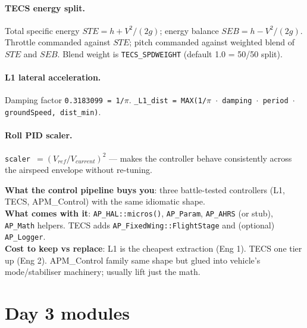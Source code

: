 \documentclass[a4paper,11pt,twoside]{article}
\renewcommand{\adoptionsidebar}[1]{\begin{tcolorbox}[colback=cyan!4!white,colframe=cyan!50!black,title=Adoption side-bar,breakable]#1\end{tcolorbox}}
\begin{document}
\paragraph{TECS energy split.} Total specific energy $STE = h + V^2/(2g)$; energy balance $SEB = h - V^2/(2g)$. Throttle commanded against $STE$; pitch commanded against weighted blend of $STE$ and $SEB$. Blend weight is \texttt{TECS\_SPDWEIGHT} (default 1.0 = 50/50 split).

\paragraph{L1 lateral acceleration.} Damping factor \texttt{0.3183099 = 1/$\pi$}. \texttt{\_L1\_dist = MAX(1/$\pi$ $\cdot$ damping $\cdot$ period $\cdot$ groundSpeed, dist\_min)}.

\paragraph{Roll PID scaler.} \texttt{scaler $= (V_{ref} / V_{current})^2$} --- makes the controller behave consistently across the airspeed envelope without re-tuning.

\adoptionsidebar{
\textbf{What the control pipeline buys you}: three battle-tested controllers (L1, TECS, APM\_Control) with the same idiomatic shape.\\
\textbf{What comes with it}: \texttt{AP\_HAL::micros()}, \texttt{AP\_Param}, \texttt{AP\_AHRS} (or stub), \texttt{AP\_Math} helpers. TECS adds \texttt{AP\_FixedWing::FlightStage} and (optional) \texttt{AP\_Logger}.\\
\textbf{Cost to keep vs replace}: L1 is the cheapest extraction (Eng 1). TECS one tier up (Eng 2). APM\_Control family same shape but glued into vehicle's mode/stabiliser machinery; usually lift just the math.}

\section*{Day 3 modules}
\end{document}
